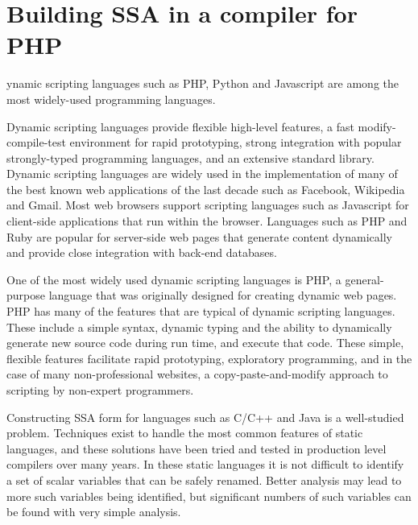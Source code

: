 \chapter{Building SSA in a compiler for PHP
  }

\providecommand{\phc}{PHC}
\providecommand{\php}[1]{\textit{#1}}
\providecommand{\pbterm}[1]{\textsf{#1}}
\providecommand{\chref}[1]{Chapter~#1}
\providecommand{\secref}[1]{Chapter~#1}
\providecommand{\figref}[1]{Figure~#1}
\providecommand{\comnt}[1]


Dynamic scripting languages
such as PHP, Python and Javascript are among the most
widely-used programming languages.

Dynamic scripting languages provide flexible high-level features, a
fast modify-compile-test environment for rapid prototyping, strong
integration with popular strongly-typed programming languages, and an
extensive standard library.  Dynamic scripting languages are widely
used in the implementation of many of the best known web applications
of the last decade such as Facebook, Wikipedia and Gmail. Most web
browsers support scripting languages such as Javascript for
client-side applications that run within the browser. Languages such
as PHP and Ruby are popular for server-side web pages that generate
content dynamically and provide close integration with back-end
databases.

One of the most widely used dynamic scripting languages is PHP, a
general-purpose language that was originally designed for creating
dynamic web pages.  PHP has many of the features that are typical of
dynamic scripting languages.  These include a simple syntax, dynamic
typing and the ability to dynamically generate new source code during
run time, and execute that code. These simple, flexible features
facilitate rapid prototyping, exploratory programming, and in the case
of many non-professional websites, a copy-paste-and-modify approach to
scripting by non-expert programmers.

Constructing SSA form for languages such as C/C++ and Java is a
well-studied problem. Techniques exist to handle the most common
features of static languages, and these solutions have been tried and
tested in production level compilers over many years.  In these static
languages it is not difficult to identify a set of scalar variables
that can be safely renamed.  Better analysis may lead to more such
variables being identified, but significant numbers of such variables
can be found with very simple analysis.

